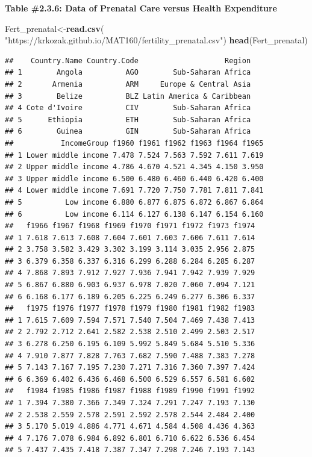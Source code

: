 \documentclass[
]{book}
\newenvironment{Shaded}{\begin{snugshade}}{\end{snugshade}}
\newcommand{\KeywordTok}[1]{\textcolor[rgb]{0.13,0.29,0.53}{\textbf{#1}}}
\newcommand{\NormalTok}[1]{#1}
\newcommand{\StringTok}[1]{\textcolor[rgb]{0.31,0.60,0.02}{#1}}
\begin{document}
\textbf{Table \#2.3.6: Data of Prenatal Care versus Health Expenditure}

\begin{Shaded}
\begin{Highlighting}[]
\NormalTok{Fert_prenatal<-}\KeywordTok{read.csv}\NormalTok{(}
  \StringTok{"https://krkozak.github.io/MAT160/fertility_prenatal.csv"}\NormalTok{)}
\KeywordTok{head}\NormalTok{(Fert_prenatal)}
\end{Highlighting}
\end{Shaded}

\begin{verbatim}
##    Country.Name Country.Code                    Region
## 1        Angola          AGO        Sub-Saharan Africa
## 2       Armenia          ARM     Europe & Central Asia
## 3        Belize          BLZ Latin America & Caribbean
## 4 Cote d'Ivoire          CIV        Sub-Saharan Africa
## 5      Ethiopia          ETH        Sub-Saharan Africa
## 6        Guinea          GIN        Sub-Saharan Africa
##           IncomeGroup f1960 f1961 f1962 f1963 f1964 f1965
## 1 Lower middle income 7.478 7.524 7.563 7.592 7.611 7.619
## 2 Upper middle income 4.786 4.670 4.521 4.345 4.150 3.950
## 3 Upper middle income 6.500 6.480 6.460 6.440 6.420 6.400
## 4 Lower middle income 7.691 7.720 7.750 7.781 7.811 7.841
## 5          Low income 6.880 6.877 6.875 6.872 6.867 6.864
## 6          Low income 6.114 6.127 6.138 6.147 6.154 6.160
##   f1966 f1967 f1968 f1969 f1970 f1971 f1972 f1973 f1974
## 1 7.618 7.613 7.608 7.604 7.601 7.603 7.606 7.611 7.614
## 2 3.758 3.582 3.429 3.302 3.199 3.114 3.035 2.956 2.875
## 3 6.379 6.358 6.337 6.316 6.299 6.288 6.284 6.285 6.287
## 4 7.868 7.893 7.912 7.927 7.936 7.941 7.942 7.939 7.929
## 5 6.867 6.880 6.903 6.937 6.978 7.020 7.060 7.094 7.121
## 6 6.168 6.177 6.189 6.205 6.225 6.249 6.277 6.306 6.337
##   f1975 f1976 f1977 f1978 f1979 f1980 f1981 f1982 f1983
## 1 7.615 7.609 7.594 7.571 7.540 7.504 7.469 7.438 7.413
## 2 2.792 2.712 2.641 2.582 2.538 2.510 2.499 2.503 2.517
## 3 6.278 6.250 6.195 6.109 5.992 5.849 5.684 5.510 5.336
## 4 7.910 7.877 7.828 7.763 7.682 7.590 7.488 7.383 7.278
## 5 7.143 7.167 7.195 7.230 7.271 7.316 7.360 7.397 7.424
## 6 6.369 6.402 6.436 6.468 6.500 6.529 6.557 6.581 6.602
##   f1984 f1985 f1986 f1987 f1988 f1989 f1990 f1991 f1992
## 1 7.394 7.380 7.366 7.349 7.324 7.291 7.247 7.193 7.130
## 2 2.538 2.559 2.578 2.591 2.592 2.578 2.544 2.484 2.400
## 3 5.170 5.019 4.886 4.771 4.671 4.584 4.508 4.436 4.363
## 4 7.176 7.078 6.984 6.892 6.801 6.710 6.622 6.536 6.454
## 5 7.437 7.435 7.418 7.387 7.347 7.298 7.246 7.193 7.143

\end{verbatim}
\end{document}
